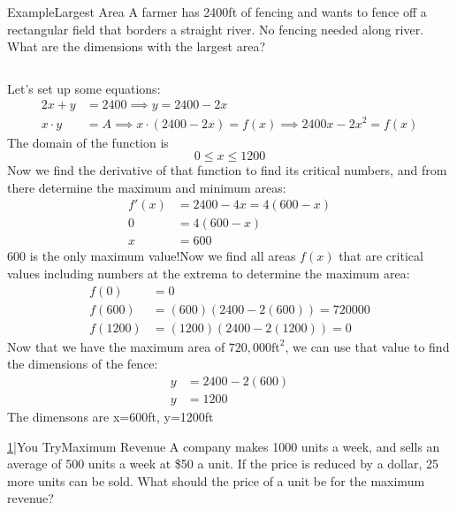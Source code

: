 \documentclass{MathNotes}
\newenvironment{example}[1]{\begin{BlueBox}{Example}{#1}}{\end{BlueBox}}
\newenvironment{practice}[2]{\begin{PurpleBox}{\texorpdfstring{#1}\Big|You Try}{#2}}{\end{PurpleBox}}
\newcommand{\bl}{
	\newline$ $\newline
}
\begin{document}
\begin{example}{Largest Area}\label{ex:max-area}
	A farmer has 2400ft of fencing and wants to fence off a rectangular field that
	borders a straight river. No fencing needed along river. What are the dimensions
	with the largest area?
	\bl
	Let's set up some equations:
	\begin{align*}
		2x+y     & =2400\implies y=2400-2x                                 \\
		x\cdot y & =A\implies x\cdot(2400-2x)=f(x)\implies 2400x-2x^2=f(x)
	\end{align*}
	The domain of the function is $$0\leq x\leq 1200$$
	Now we find the derivative of that function to find its critical numbers, and
	from there determine the maximum and minimum areas:
	\begin{align*}
		f'(x) & =2400-4x=4(600-x) \\
		0     & =4(600-x)         \\
		x     & =600
	\end{align*}
	600 is the only maximum value!\newline Now we find all areas $f(x)$ that are
	critical values including numbers at the extrema to determine the maximum area:
	\begin{align*}
		f(0)    & =0                         \\
		f(600)  & =(600)(2400-2(600))=720000 \\
		f(1200) & =(1200)(2400-2(1200))=0
	\end{align*}
	Now that we have the maximum area of $720,000\text{ft}^2$, we can use that value to find the dimensions of the fence:
	\begin{align*}
		y & =2400-2(600) \\
		y & =1200
	\end{align*}
	The dimensons are x=600ft, y=1200ft
\end{example}

\begin{practice}{\hyperref[ans:max-revenue]{1}}{Maximum Revenue}\label{prac:max-revenue}
	A company makes 1000 units a week, and sells an average of 500 units a week at \$50 a unit. If the price is reduced by a dollar, 25 more units can be sold. What should the price of a unit be for the maximum revenue?
\end{practice}
\end{document}
